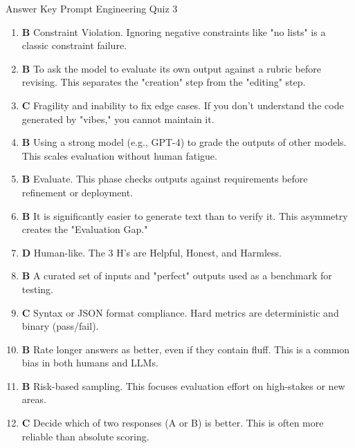 \documentclass[11pt,a4paper]{article}
\begin{document}
\begin{center}
  {\LARGE Answer Key \textemdash{} Prompt Engineering Quiz 3}\\[6pt]
\end{center}
\vspace{0.5cm}
\begin{enumerate}[leftmargin=*, label=\textbf{\#\arabic*}]

  \item \textbf{B} \textemdash{} Constraint Violation. Ignoring negative constraints like "no lists" is a classic constraint failure.
  \item \textbf{B} \textemdash{} To ask the model to evaluate its own output against a rubric before revising. This separates the "creation" step from the "editing" step.
  \item \textbf{C} \textemdash{} Fragility and inability to fix edge cases. If you don't understand the code generated by "vibes," you cannot maintain it.
  \item \textbf{B} \textemdash{} Using a strong model (e.g., GPT-4) to grade the outputs of other models. This scales evaluation without human fatigue.
  \item \textbf{B} \textemdash{} Evaluate. This phase checks outputs against requirements before refinement or deployment.
  \item \textbf{B} \textemdash{} It is significantly easier to generate text than to verify it. This asymmetry creates the "Evaluation Gap."
  \item \textbf{D} \textemdash{} Human-like. The 3 H's are Helpful, Honest, and Harmless.
  \item \textbf{B} \textemdash{} A curated set of inputs and "perfect" outputs used as a benchmark for testing.
  \item \textbf{C} \textemdash{} Syntax or JSON format compliance. Hard metrics are deterministic and binary (pass/fail).
  \item \textbf{B} \textemdash{} Rate longer answers as better, even if they contain fluff. This is a common bias in both humans and LLMs.
  \item \textbf{B} \textemdash{} Risk-based sampling. This focuses evaluation effort on high-stakes or new areas.
  \item \textbf{C} \textemdash{} Decide which of two responses (A or B) is better. This is often more reliable than absolute scoring.

\end{enumerate}
\end{document}

